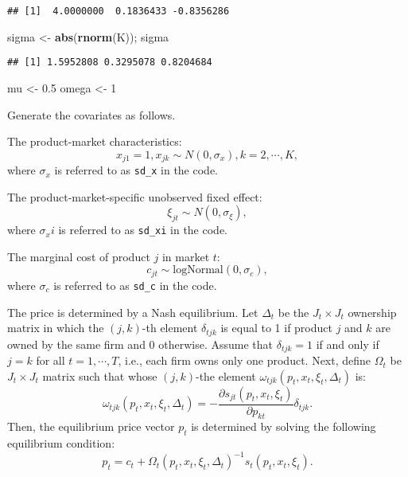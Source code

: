 \documentclass[
]{book}
\newenvironment{Shaded}{\begin{snugshade}}{\end{snugshade}}
\newcommand{\DecValTok}[1]{\textcolor[rgb]{0.00,0.00,0.81}{#1}}
\newcommand{\FloatTok}[1]{\textcolor[rgb]{0.00,0.00,0.81}{#1}}
\newcommand{\KeywordTok}[1]{\textcolor[rgb]{0.13,0.29,0.53}{\textbf{#1}}}
\newcommand{\NormalTok}[1]{#1}
\newcommand{\StringTok}[1]{\textcolor[rgb]{0.31,0.60,0.02}{#1}}
\begin{document}
\begin{verbatim}
## [1]  4.0000000  0.1836433 -0.8356286
\end{verbatim}

\begin{Shaded}
\begin{Highlighting}[]
\NormalTok{sigma <-}\StringTok{ }\KeywordTok{abs}\NormalTok{(}\KeywordTok{rnorm}\NormalTok{(K)); sigma}
\end{Highlighting}
\end{Shaded}

\begin{verbatim}
## [1] 1.5952808 0.3295078 0.8204684
\end{verbatim}

\begin{Shaded}
\begin{Highlighting}[]
\NormalTok{mu <-}\StringTok{ }\FloatTok{0.5}
\NormalTok{omega <-}\StringTok{ }\DecValTok{1}
\end{Highlighting}
\end{Shaded}

Generate the covariates as follows.

The product-market characteristics:
\[
x_{j1} = 1, x_{jk} \sim N(0, \sigma_x), k = 2, \cdots, K,
\]
where \(\sigma_x\) is referred to as \texttt{sd\_x} in the code.

The product-market-specific unobserved fixed effect:
\[
\xi_{jt} \sim N(0, \sigma_\xi),
\]
where \(\sigma_xi\) is referred to as \texttt{sd\_xi} in the code.

The marginal cost of product \(j\) in market \(t\):
\[
c_{jt} \sim \text{logNormal}(0, \sigma_c),
\]
where \(\sigma_c\) is referred to as \texttt{sd\_c} in the code.

The price is determined by a Nash equilibrium. Let \(\Delta_t\) be the \(J_t \times J_t\) ownership matrix in which the \((j, k)\)-th element \(\delta_{tjk}\) is equal to 1 if product \(j\) and \(k\) are owned by the same firm and 0 otherwise. Assume that \(\delta_{tjk} = 1\) if and only if \(j = k\) for all \(t = 1, \cdots, T\), i.e., each firm owns only one product. Next, define \(\Omega_t\) be \(J_t \times J_t\) matrix such that whose \((j, k)\)-the element \(\omega_{tjk}(p_t, x_t, \xi_t, \Delta_t)\) is:
\[
\omega_{tjk}(p_t, x_t, \xi_t, \Delta_t) = - \frac{\partial s_{jt}(p_t, x_t, \xi_t)}{\partial p_{kt}} \delta_{tjk}.
\]
Then, the equilibrium price vector \(p_t\) is determined by solving the following equilibrium condition:
\[
p_t = c_t + \Omega_t(p_t, x_t, \xi_t, \Delta_t)^{-1} s_t(p_t, x_t, \xi_t).
\]
\end{document}

